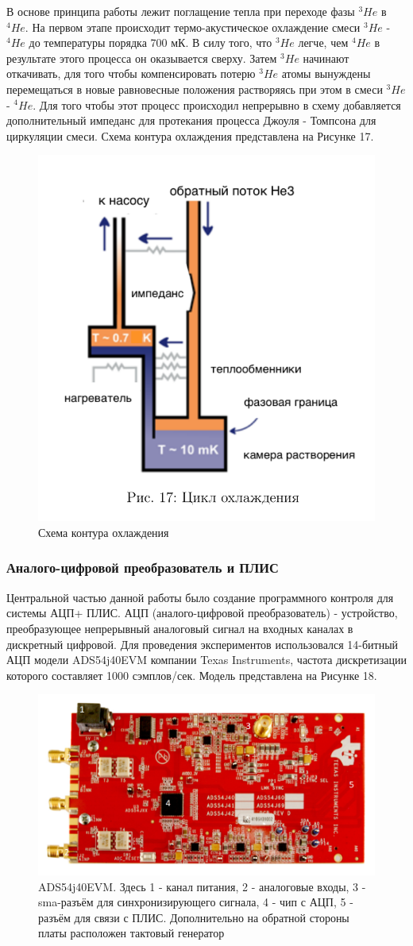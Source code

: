 В основе принципа работы лежит поглащение тепла при переходе фазы $^{3}He$ в $^{4}He$. На первом этапе происходит термо-акустическое охлаждение смеси  $^{3}He$ - $^{4}He$ до температуры порядка 700 мК. В силу того, что  $^{3}He$ легче, чем $^{4}He$ в результате этого процесса он оказывается сверху. Затем $^{3}He$ начинают откачивать, для того чтобы компенсировать потерю $^{3}He$ атомы вынуждены перемещаться в новые равновесные положения растворяясь при этом в смеси $^{3}He$ - $^{4}He$. Для того чтобы этот процесс происходил непрерывно в схему добавляется дополнительный импеданс для протекания процесса Джоуля - Томпсона для циркуляции смеси. Схема контура охлаждения представлена на Рисунке 17. 
\begin{figure}[h]
	\centering
	\includegraphics[width=0.5\linewidth]{pictures/fridgesheme}
	\caption{Схема контура охлаждения}
	\label{fig:fridgesheme}
\end{figure}
 
 \subsubsection {Аналого-цифровой преобразователь и ПЛИС}\label{adsfpga}
 Центральной частью данной работы было создание программного контроля для системы АЦП+ ПЛИС. АЦП (аналого-цифровой преобразователь) - устройство, преобразующее непрерывный аналоговый сигнал на входных каналах в дискретный цифровой. Для проведения экспериментов использовался 14-битный АЦП модели ADS54j40EVM компании Texas Instruments, частота дискретизации которого составляет 1000 сэмплов/сек. Модель представлена на Рисунке 18.
 
 \begin{figure}[!h]
 	\centering
 	\includegraphics[width=0.7\linewidth]{pictures/ads}
 	\caption{ADS54j40EVM. Здесь 1 - канал питания, 2 - аналоговые входы, 3 - sma-разъём для синхронизирующего сигнала, 4 - чип с АЦП, 5 - разъём для связи с ПЛИС. Дополнительно на обратной стороны платы расположен тактовый генератор  }
 	\label{fig:ads}
 \end{figure}

